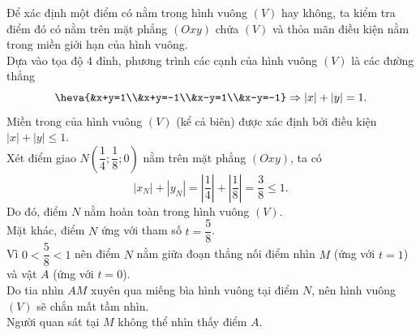 \begin{ex}
{\begin{itemchoice}
			\itemch Để xác định một điểm có nằm trong hình vuông $(V)$ hay không, ta kiểm tra điểm đó có nằm trên mặt phẳng $(Oxy)$ chứa $(V)$ và thỏa mãn điều kiện nằm trong miền giới hạn của hình vuông.\\
			Dựa vào tọa độ $4$ đỉnh, phương trình các cạnh của hình vuông $(V)$ là các đường thẳng
			\[\heva{&x+y=1\\&x+y=-1\\&x-y=1\\&x-y=-1} \Rightarrow |x| + |y| = 1. \]
			Miền trong của hình vuông $(V)$ (kể cả biên) được xác định bởi điều kiện $|x| + |y| \le 1$.\\
			Xét điểm giao $N\left(\dfrac{1}{4}; \dfrac{1}{8}; 0\right)$ nằm trên mặt phẳng $(Oxy)$, ta có
			\[|x_N| + |y_N| = \left|\dfrac{1}{4}\right| + \left|\dfrac{1}{8}\right| = \dfrac{3}{8} \le 1. \]
			Do đó, điểm $N$ nằm hoàn toàn trong hình vuông $(V)$.\\
			Mặt khác, điểm $N$ ứng với tham số $t = \dfrac{5}{8}$.\\ Vì $0 < \dfrac{5}{8} < 1$ nên điểm $N$ nằm giữa đoạn thẳng nối điểm nhìn $M$ (ứng với $t=1$) và vật $A$ (ứng với $t=0$).\\
			Do tia nhìn $AM$ xuyên qua miếng bìa hình vuông tại điểm $N$, nên hình vuông $(V)$ sẽ chắn mất tầm nhìn.\\ Người quan sát tại $M$ không thể nhìn thấy điểm $A$.
		\end{itemchoice}
	}
\end{ex}

